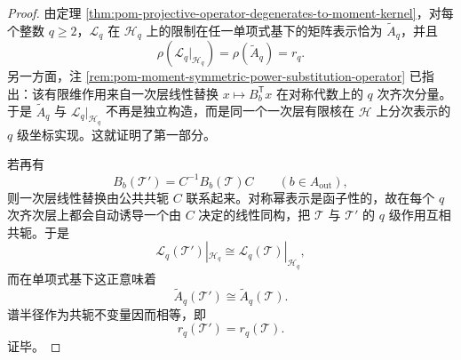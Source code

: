 \begin{proof}
由定理 \ref{thm:pom-projective-operator-degenerates-to-moment-kernel}，对每个整数 \(q\ge 2\)，\(\mathcal L_q\) 在 \(\mathcal H_q\) 上的限制在任一单项式基下的矩阵表示恰为 \(\widetilde A_q\)，并且
\[
\rho(\mathcal L_q|_{\mathcal H_q})=\rho(\widetilde A_q)=r_q.
\]
另一方面，注 \ref{rem:pom-moment-symmetric-power-substitution-operator} 已指出：该有限维作用来自一次层线性替换 \(x\mapsto B_b^{\mathsf T}x\) 在对称代数上的 \(q\) 次齐次分量。于是 \(\widetilde A_q\) 与 \(\mathcal L_q|_{\mathcal H_q}\) 不再是独立构造，而是同一个一次层有限核在 \(\mathcal H\) 上分次表示的 \(q\) 级坐标实现。这就证明了第一部分。

若再有
\[
B_b(\mathcal T')=C^{-1}B_b(\mathcal T)C
\qquad (b\in A_{\mathrm{out}}),
\]
则一次层线性替换由公共共轭 \(C\) 联系起来。对称幂表示是函子性的，故在每个 \(q\) 次齐次层上都会自动诱导一个由 \(C\) 决定的线性同构，把 \(\mathcal T\) 与 \(\mathcal T'\) 的 \(q\) 级作用互相共轭。于是
\[
\mathcal L_q(\mathcal T')|_{\mathcal H_q}
\cong
\mathcal L_q(\mathcal T)|_{\mathcal H_q},
\]
而在单项式基下这正意味着
\[
\widetilde A_q(\mathcal T')
\cong
\widetilde A_q(\mathcal T).
\]
谱半径作为共轭不变量因而相等，即
\[
r_q(\mathcal T')=r_q(\mathcal T).
\]
证毕。
\end{proof}

